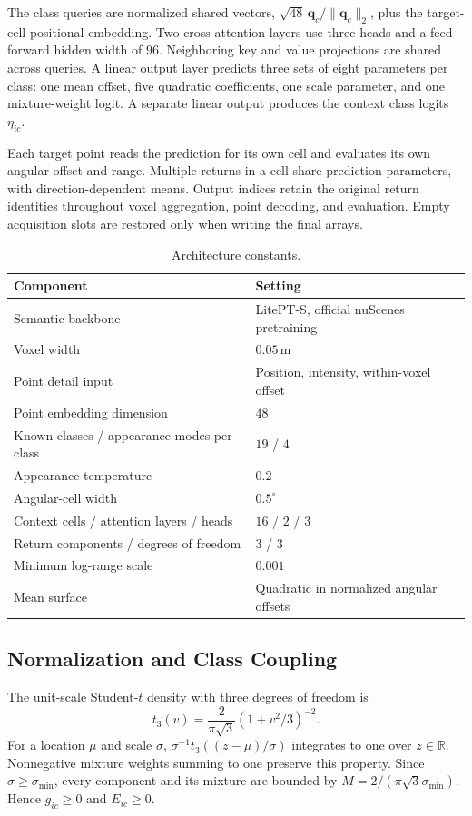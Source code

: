 \documentclass{article}
\newcommand{\R}{\mathbb{R}}
\begin{document}
The class queries are normalized shared vectors, $\sqrt{48}\,\mathbf q_c/\|\mathbf q_c\|_2$, plus the target-cell positional embedding. Two cross-attention layers use three heads and a feed-forward hidden width of $96$. Neighboring key and value projections are shared across queries. A linear output layer predicts three sets of eight parameters per class: one mean offset, five quadratic coefficients, one scale parameter, and one mixture-weight logit. A separate linear output produces the context class logits $\eta_{ic}$.

Each target point reads the prediction for its own cell and evaluates its own angular offset and range. Multiple returns in a cell share prediction parameters, with direction-dependent means. Output indices retain the original return identities throughout voxel aggregation, point decoding, and evaluation. Empty acquisition slots are restored only when writing the final arrays.

\begin{table}[ht]
\centering\small
\caption{Architecture constants.}
\begin{tabular}{ll}
\toprule
Component & Setting\\
\midrule
Semantic backbone & LitePT-S, official nuScenes pretraining\\
Voxel width & $0.05$\,m\\
Point detail input & Position, intensity, within-voxel offset\\
Point embedding dimension & $48$\\
Known classes / appearance modes per class & $19$ / $4$\\
Appearance temperature & $0.2$\\
Angular-cell width & $0.5^\circ$\\
Context cells / attention layers / heads & $16$ / $2$ / $3$\\
Return components / degrees of freedom & $3$ / $3$\\
Minimum log-range scale & $0.001$\\
Mean surface & Quadratic in normalized angular offsets\\
\bottomrule
\end{tabular}
\end{table}

\subsection{Normalization and Class Coupling}
The unit-scale Student-$t$ density with three degrees of freedom is
\begin{equation}
 t_3(v)=\frac{2}{\pi\sqrt3}(1+v^2/3)^{-2}.
\end{equation}
For a location $\mu$ and scale $\sigma$, $\sigma^{-1}t_3((z-\mu)/\sigma)$ integrates to one over $z\in\R$. Nonnegative mixture weights summing to one preserve this property. Since $\sigma\geq\sigma_{\min}$, every component and its mixture are bounded by $M=2/(\pi\sqrt3\sigma_{\min})$. Hence $g_{ic}\geq0$ and $E_{ic}\geq0$.
\end{document}
